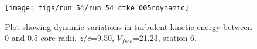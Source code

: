 \begin{figure}[H]
\centering
\texttt{[image: figs/run\_54/run\_54\_ctke\_005rdynamic]}
\caption{Plot showing dynamic variations in turbulent kinetic energy between 0 and 0.5 core radii. $z/c$=9.50, $V_{free}$=21.23, station 6.}
\label{fig:run_54_ctke_005rdynamic}
\end{figure}


